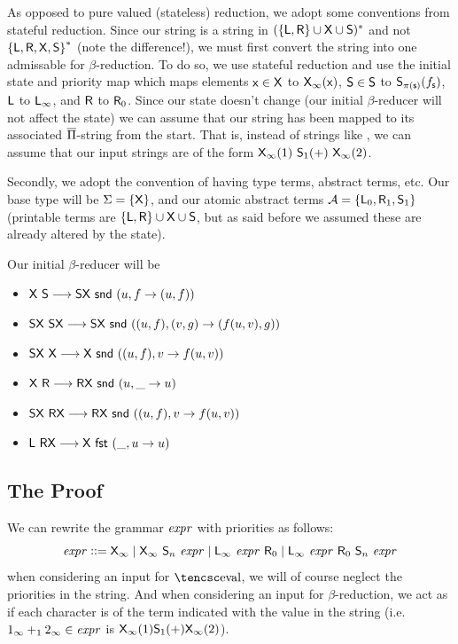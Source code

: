 \documentclass{llncs}
\begin{document}
As opposed to pure valued (stateless) reduction, we adopt some conventions from stateful reduction.
Since our string is a string in $(\set{\s L,\s R}\cup\s X\cup\s S)^*$ and not $\set{\s L,\s R,\s X,\s S}^*$ (note the difference!), we must first convert the string into one admissable for
$\beta$-reduction.
To do so, we use stateful reduction and use the initial state and priority map which maps elements $\mathsf{x}\in\mathsf{X}$ to $\mathsf{X}_\infty(\mathsf{x})$, $\mathsf{S}\in\mathsf{S}$ to $\mathsf{S}_{\pi(\mathsf{s})}(f_{\mathsf{s}})$, $\mathsf{L}$ to
$\mathsf{L}_\infty$, and $\mathsf{R}$ to $\mathsf{R}_0$.
Since our state doesn't change (our initial $\beta$-reducer will not affect the state) we can assume that our string has been mapped to its associated $\overline{\Pi}$-string from the start.
That is, instead of strings like , we can assume that our input strings are of the form $\mathsf{X}_\infty(1)\ \mathsf{S}_1(+)\ \mathsf{X}_\infty(2)$.

Secondly, we adopt the convention of having type terms, abstract terms, etc.
Our base type will be $\Sigma=\set{\s X}$, and our atomic abstract terms $\mathcal A=\set{\s L_0,\s R_1,\s S_1}$ (printable terms are $\set{\s L,\s R}\cup\s X\cup\s S$, but as said before we assumed these
are already altered by the state).

Our initial $\beta$-reducer will be
\begin{itemize}
    \item $\s X\ \s S\longto\s S\s X\ \snd\ (u,f\to(u,f))$
    \item $\s S\s X\ \s S\s X \longto\s S\s X\ \snd\ ((u,f),(v,g)\to(f(u,v),g))$
    \item $\s S\s X\ \s X\longto\s X\ \snd\ ((u,f),v\to f(u,v))$
    \item $\s X\ \s R \longto \s R\s X\ \snd\ (u,\_\to u)$
    \item $\s S\s X\ \s R\s X \longto\s R\s X\ \snd\ ((u,f),v\to f(u,v))$
    \item $\s L\ \s R\s X \longto\s X\ \fst\ (\_,u\to u)$
\end{itemize}

\subsection{The Proof}

We can rewrite the grammar ${\it expr}$ with priorities as follows:
\[ {\it expr} \mathrel{{\mathop:}{\mathop:}{=}} \mathsf{X}_\infty \mid \mathsf{X}_\infty\ \mathsf{S}_n\ {\it expr} \mid \mathsf{L}_\infty\ {\it expr}\ \mathsf{R}_0 \mid \mathsf{L}_\infty\ {\it expr}\ \mathsf{R}_0\ \mathsf{S}_n\ {\it expr} \]
when considering an input for $\eval$, we will of course neglect the priorities in the string.
And when considering an input for $\beta$-reduction, we act as if each character is of the term indicated with the value in the string (i.e. $1_\infty+_12_\infty\in{\it expr}$ is
$\mathsf{X}_\infty(1)\mathsf{S}_1(+)\mathsf{X}_\infty(2)$).
\end{document}
